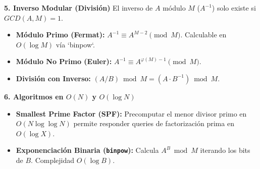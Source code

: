\textbf{5. Inverso Modular (División)}
El inverso de $A$ módulo $M$ ($A^{-1}$) solo existe si $GCD(A, M) = 1$.
\begin{itemize}
    \item \textbf{Módulo Primo (Fermat):} $A^{-1} \equiv A^{M-2} \pmod M$. Calculable en $O(\log M)$ vía `binpow`.
    \item \textbf{Módulo No Primo (Euler):} $A^{-1} \equiv A^{\varphi(M)-1} \pmod M$.
    \item \textbf{División con Inverso:} $(A / B) \bmod M = (A \cdot B^{-1}) \bmod M$.
\end{itemize}

\textbf{6. Algoritmos en $O(N)$ y $O(\log N)$}
\begin{itemize}
    \item \textbf{Smallest Prime Factor (SPF):} Precomputar el menor divisor primo en $O(N \log \log N)$ permite responder queries de factorización prima en $O(\log X)$.
    \item \textbf{Exponenciación Binaria (\texttt{binpow}):} Calcula $A^B \bmod M$ iterando los bits de $B$. Complejidad $O(\log B)$.
\end{itemize}